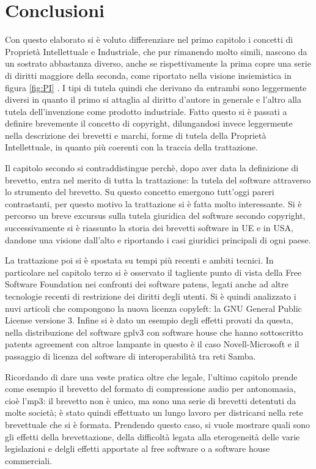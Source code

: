  \chapter{Conclusioni}

Con questo elaborato si è voluto differenziare nel primo capitolo i concetti di Proprietà Intellettuale e Industriale, che pur rimanendo molto simili, nascono da un sostrato abbastanza diverso, anche se rispettivamente la prima copre una serie di diritti maggiore della seconda, come riportato nella visione insiemistica in figura \ref{fig:PI} . I tipi di tutela quindi che derivano da entrambi sono leggermente diversi in quanto il primo si attaglia al diritto d'autore in generale e l'altro alla tutela dell'invenzione come prodotto industriale. Fatto questo si è passati a definire brevemente il concetto di copyright, dilungandosi invece leggermente nella descrizione dei brevetti e marchi, forme di tutela della Proprietà Intellettuale, in quanto più coerenti con la traccia della trattazione.

Il capitolo secondo si contraddistingue perchè, dopo aver data la definizione di brevetto, entra nel merito di tutta la trattazione: la tutela del software attraverso lo strumento del brevetto. Su questo concetto emergono tutt'oggi pareri contrastanti, per questo motivo la trattazione si è fatta molto interessante. Si è percorso un breve excursus sulla tutela giuridica del software secondo copyright, successivamente si è riassunto la storia dei brevetti software in UE e in USA, dandone una visione dall'alto e riportando i casi giuridici principali di ogni paese.

La trattazione poi si è spostata su tempi più recenti e ambiti tecnici. In particolare nel capitolo terzo si è osservato il tagliente punto di vista della Free Software Foundation nei confronti dei software patens, legati anche ad altre tecnologie recenti di restrizione dei diritti degli utenti. Si è quindi analizzato i nuvi articoli che compongono la nuova licenza copyleft: la GNU General Public License versione 3.
Infine si è dato un esempio degli effetti provati da questa, nella distribuzione del software gplv3 con software house che hanno sottoscritto patents agreement con altroe lampante in questo è il caso Novell-Microsoft e il passaggio di licenza del software di interoperabilità tra reti Samba.

Ricordando di dare una veste pratica oltre che legale, l'ultimo capitolo prende come esempio il brevetto del formato di compressione audio per antonomasia, cioè l'mp3: il brevetto non è unico, ma sono una serie di brevetti detentuti da molte società; è stato quindi effettuato un lungo lavoro per districarsi nella rete brevettuale che si è formata. Prendendo questo caso, si vuole mostrare quali sono gli effetti della brevettazione, della difficoltà legata alla eterogeneità delle varie legislazioni e delgli effetti apportate al free software o a software house commerciali.

